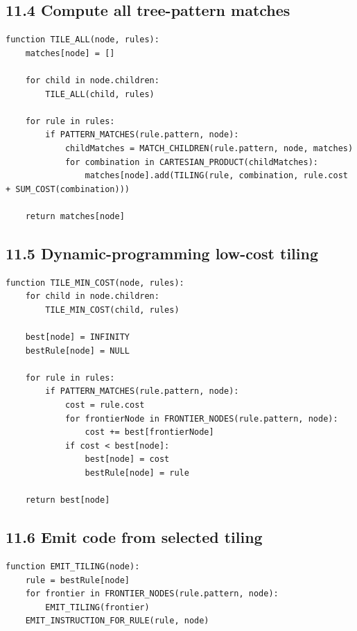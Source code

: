 \documentclass[10pt,letterpaper]{article}
\begin{document}
\subsection*{11.4 Compute all tree-pattern matches}
{}

\begin{verbatim}
function TILE_ALL(node, rules):
    matches[node] = []

    for child in node.children:
        TILE_ALL(child, rules)

    for rule in rules:
        if PATTERN_MATCHES(rule.pattern, node):
            childMatches = MATCH_CHILDREN(rule.pattern, node, matches)
            for combination in CARTESIAN_PRODUCT(childMatches):
                matches[node].add(TILING(rule, combination, rule.cost + SUM_COST(combination)))

    return matches[node]
\end{verbatim}

\subsection*{11.5 Dynamic-programming low-cost tiling}
{}

\begin{verbatim}
function TILE_MIN_COST(node, rules):
    for child in node.children:
        TILE_MIN_COST(child, rules)

    best[node] = INFINITY
    bestRule[node] = NULL

    for rule in rules:
        if PATTERN_MATCHES(rule.pattern, node):
            cost = rule.cost
            for frontierNode in FRONTIER_NODES(rule.pattern, node):
                cost += best[frontierNode]
            if cost < best[node]:
                best[node] = cost
                bestRule[node] = rule

    return best[node]
\end{verbatim}

\subsection*{11.6 Emit code from selected tiling}
{}

\begin{verbatim}
function EMIT_TILING(node):
    rule = bestRule[node]
    for frontier in FRONTIER_NODES(rule.pattern, node):
        EMIT_TILING(frontier)
    EMIT_INSTRUCTION_FOR_RULE(rule, node)
\end{verbatim}
\end{document}

